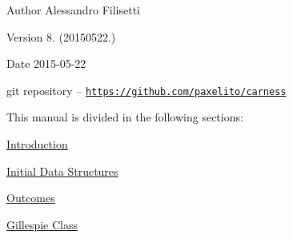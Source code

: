 \begin{DoxyAuthor}{Author}
Alessandro Filisetti 
\end{DoxyAuthor}
\begin{DoxyVersion}{Version}
8. (20150522.) 
\end{DoxyVersion}
\begin{DoxyDate}{Date}
2015-\/05-\/22
\end{DoxyDate}
git repository -- \href{https://github.com/paxelito/carness}{\tt https\-://github.\-com/paxelito/carness}

This manual is divided in the following sections\-:
\begin{DoxyItemize}
\item \hyperlink{intro}{Introduction}
\item \hyperlink{pageInitStr}{Initial Data Structures}
\item \hyperlink{pageoutcomes}{Outcomes}
\item \hyperlink{pageGillespie}{Gillespie Class} 
\end{DoxyItemize}